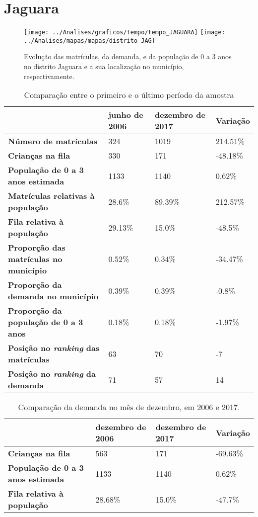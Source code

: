 \section{Jaguara}
\begin{figure}[H]
	\centering
	\texttt{[image: ../Analises/graficos/tempo/tempo\_JAGUARA]}
	\texttt{[image: ../Analises/mapas/mapas/distrito\_JAG]}
	\caption{Evolução das matrículas, da demanda, e da população de 0 a 3 anos no distrito Jaguara e a sua localização no município, respectivamente.}
\end{figure}
\begin{table}[H]
	\begin{tabular}{|l|l|l|l|}
		\hline
		\textbf{}                                      & \textbf{junho de 2006}       & \textbf{dezembro de 2017}    & \textbf{Variação} \\ \hline
		\textbf{Número de matrículas}                  & 324 & 1019 & 214.51\% \\ \hline
		\textbf{Crianças na fila}                      & 330 & 171 & -48.18\% \\ \hline
		\textbf{População de 0 a 3 anos estimada}      & 1133 & 1140 & 0.62\% \\ \hline
		\textbf{Matrículas relativas à população}      & 28.6\% & 89.39\% & 212.57\% \\ \hline
		\textbf{Fila relativa à população}             & 29.13\% & 15.0\% & -48.5\% \\ \hline
		\textbf{Proporção das matrículas no município} & 0.52\% & 0.34\% & -34.47\% \\ \hline
		\textbf{Proporção da demanda no município}     & 0.39\% & 0.39\% & -0.8\% \\ \hline
		\textbf{Proporção da população de 0 a 3 anos}  & 0.18\% & 0.18\% & -1.97\% \\ \hline
		\textbf{Posição no \textit{ranking} das matrículas}     & 63 & 70 & -7 \\ \hline
		\textbf{Posição no \textit{ranking} da demanda}         & 71 & 57 & 14 \\ \hline
	\end{tabular}
	\caption{Comparação entre o primeiro e o último período da amostra}
\end{table}
\begin{table}[H]
	\begin{tabular}{|l|l|l|l|}
		\hline
		\textbf{}                                 & \textbf{dezembro de 2006} & \textbf{dezembro de 2017} & \textbf{Variação} \\ \hline
		\textbf{Crianças na fila}                      & 563 & 171 & -69.63\% \\ \hline
		\textbf{População de 0 a 3 anos estimada}      & 1133 & 1140 & 0.62\% \\ \hline
		\textbf{Fila relativa à população}             & 28.68\% & 15.0\% & -47.7\% \\ \hline
	\end{tabular}
	\caption{Comparação da demanda no mês de dezembro, em 2006 e 2017.}
\end{table}

